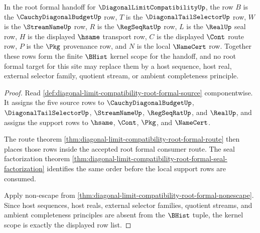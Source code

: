 \begin{theorem}
\label{thm:diagonal-limit-compatibility-root-formal-kernel-scope}
In the root formal handoff for $\DiagonalLimitCompatibilityUp$, the row $B$ is the $\CauchyDiagonalBudgetUp$ row, $T$ is the $\DiagonalTailSelectorUp$ row, $W$ is the $\StreamNameUp$ row, $R$ is the $\RegSeqRatUp$ row, $L$ is the $\RealUp$ seal row, $H$ is the displayed $\hsame$ transport row, $C$ is the displayed $\Cont$ route row, $P$ is the $\Pkg$ provenance row, and $N$ is the local $\NameCert$ row. Together these rows form the finite $\BHist$ kernel scope for the handoff, and no root formal target for this site may replace them by a host sequence, host real, external selector family, quotient stream, or ambient completeness principle.
\end{theorem}
\begin{proof}
Read \autoref{def:diagonal-limit-compatibility-root-formal-source} componentwise. It assigns the five source rows to $\CauchyDiagonalBudgetUp$, $\DiagonalTailSelectorUp$, $\StreamNameUp$, $\RegSeqRatUp$, and $\RealUp$, and assigns the support rows to $\hsame$, $\Cont$, $\Pkg$, and $\NameCert$.

The route theorem \autoref{thm:diagonal-limit-compatibility-root-formal-route} then places those rows inside the accepted root formal consumer route. The seal factorization theorem \autoref{thm:diagonal-limit-compatibility-root-formal-seal-factorization} identifies the same order before the local support rows are consumed.

Apply non-escape from \autoref{thm:diagonal-limit-compatibility-root-formal-nonescape}. Since host sequences, host reals, external selector families, quotient streams, and ambient completeness principles are absent from the $\BHist$ tuple, the kernel scope is exactly the displayed row list.
\end{proof}

